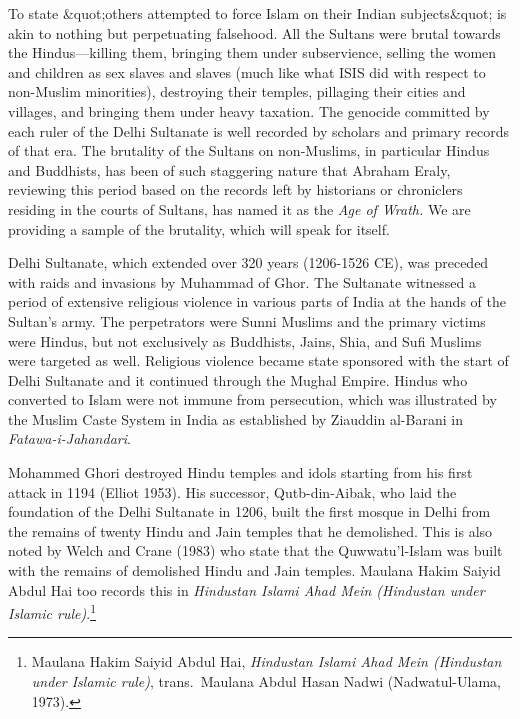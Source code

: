 To state &quot;others attempted to force Islam on their Indian subjects&quot; is akin to nothing but perpetuating falsehood. All the Sultans were brutal towards the Hindus—killing them, bringing them under subservience, selling the women and children as sex slaves and slaves (much like what ISIS did with respect to non-Muslim minorities), destroying their temples, pillaging their cities and villages, and bringing them under heavy taxation. The genocide committed by each ruler of the Delhi Sultanate is well recorded by scholars and primary records of that era. The brutality of the Sultans on non-Muslims, in particular Hindus and Buddhists, has been of such staggering nature that Abraham Eraly, reviewing this period based on the records left by historians or chroniclers residing in the courts of Sultans, has named it as the \textit{Age of Wrath.} We are providing a sample of the brutality, which will speak for itself. 

Delhi Sultanate, which extended over 320 years (1206-1526 CE), was preceded with raids and invasions by Muhammad of Ghor. The Sultanate witnessed a period of extensive religious violence in various parts of India at the hands of the Sultan’s army. The perpetrators were Sunni Muslims and the primary victims were Hindus, but not exclusively as Buddhists, Jains, Shia, and Sufi Muslims were targeted as well. Religious violence became state sponsored with the start of Delhi Sultanate and it continued through the Mughal Empire. Hindus who converted to Islam were not immune from persecution, which was illustrated by the Muslim Caste System in India as established by Ziauddin al-Barani in\textit{ Fatawa-i-Jahandari}.

Mohammed Ghori destroyed Hindu temples and idols starting from his first attack in 1194 (Elliot 1953). His successor, Qutb-din-Aibak, who laid the foundation of the Delhi Sultanate in 1206, built the first mosque in Delhi from the remains of twenty Hindu and Jain temples that he demolished. This is also noted by Welch and Crane (1983) who state that the Quwwatu'l-Islam was built with the remains of demolished Hindu and Jain temples. Maulana Hakim Saiyid Abdul Hai too records this in \textit{Hindustan Islami Ahad Mein (Hindustan under Islamic rule)}.\footnote{Maulana 	Hakim Saiyid Abdul Hai, \textit{Hindustan Islami Ahad Mein (Hindustan under Islamic rule)}, trans.\ Maulana Abdul Hasan Nadwi (Nadwatul-Ulama, 1973).} 

